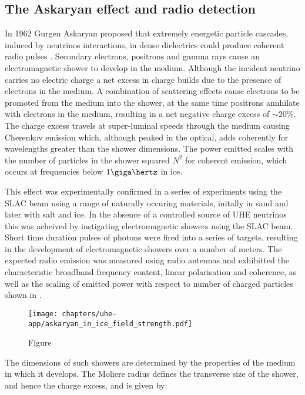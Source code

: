 \subsection{The Askaryan effect and radio detection}
\label{sec:uhe-app:UHEN:Askaryan}

In 1962 Gurgen Askaryan proposed that extremely energetic particle cascades, induced by neutrinos interactions, in dense dielectrics could produce coherent radio pulses \cite{Askaryan1965} \cite{Askaryan1962}. Secondary electrons, positrons and gamma rays cause an electromagnetic shower to develop in the medium. Although the incident neutrino carries no electric charge a net excess in charge builds due to the presence of electrons in the medium. A combination of scattering effects cause electrons to be promoted from the medium into the shower, at the same time positrons annhilate with electrons in the medium, resulting in a net negative charge excess of $\sim 20\%$. The charge excess travels at super-luminal speeds through the medium causing Cherenkov emission which, although peaked in the optical, adds coherently for wavelengths greater than the shower dimensions. The power emitted scales with the number of particles in the shower squared $N^{2}$ for coherent emission, which occurs at frequencies below $1\giga \hertz$ in ice. 

This effect was experimentally confirmed in a series of experiments using the SLAC beam using a range of naturally occuring materials, initally in sand and later with salt and ice. In the absence of a controlled source of UHE neutrinos this was acheived by instigating electromagnetic showers using the SLAC beam. Short time duration pulses of \GeV photons were fired into a series of targets, resulting in the development of electromagnetic showers over a number of meters. The expected radio emission was measured using radio antennas and exhibitted the characteristic broadband frequency content, linear polarisation and coherence, as well as the scaling of emitted power with respect to number of charged particles  shown in .


\begin{figure}[htpb]
  \centering
  \texttt{[image: chapters/uhe-app/askaryan\_in\_ice\_field\_strength.pdf]}
  \caption{Figure}
  \label{fig:uhe-app:UHEN:Askaryan:Askaryan_in_ice}
\end{figure}

The dimensions of such showers are determined by the properties of the medium in which it develops. The Moliere radius defines the transverse size of the shower, and hence the charge excess, and is given by:

